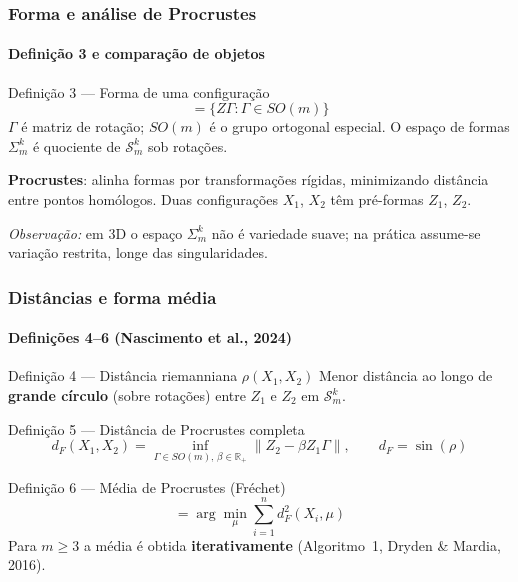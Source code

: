 \documentclass[brazilian,11pt]{beamer}
\begin{document}
\begin{frame}[shrink=8]
    \frametitle{Forma e análise de Procrustes}
    \framesubtitle{Definição 3 e comparação de objetos}

    \begin{block}{Definição 3 --- Forma de uma configuração}
        \begin{equation}
            [Z] = \{ Z\Gamma : \Gamma \in SO(m) \}
        \end{equation}
        $\Gamma$ é matriz de rotação; $SO(m)$ é o grupo ortogonal especial. O espaço de formas $\Sigma_m^k$ é quociente de $\mathcal{S}_m^k$ sob rotações.
    \end{block}

    \textbf{Procrustes}: alinha formas por transformações rígidas, minimizando distância entre pontos homólogos. Duas configurações $X_1$, $X_2$ têm pré-formas $Z_1$, $Z_2$.

    \vspace{0.2em}
    \footnotesize\textit{Observação:} em 3D o espaço $\Sigma_m^k$ não é variedade suave; na prática assume-se variação restrita, longe das singularidades.
\end{frame}

\begin{frame}[shrink=12]
    \frametitle{Distâncias e forma média}
    \framesubtitle{Definições 4--6 (Nascimento et al., 2024)}

    \small
    \begin{block}{Definição 4 --- Distância riemanniana $\rho(X_1,X_2)$}
        Menor distância ao longo de \textbf{grande círculo} (sobre rotações) entre $Z_1$ e $Z_2$ em $\mathcal{S}_m^k$.
    \end{block}

    \begin{block}{Definição 5 --- Distância de Procrustes completa}
        \begin{equation}
            d_F(X_1, X_2) = \inf_{\Gamma \in SO(m),\, \beta \in \mathbb{R}_+} \left\| Z_2 - \beta Z_1 \Gamma \right\|, \qquad d_F = \sin(\rho)
        \end{equation}
    \end{block}

    \begin{block}{Definição 6 --- Média de Procrustes (Fréchet)}
        \begin{equation}
            [\hat{\mu}] = \arg\min_{\mu} \sum_{i=1}^{n} d_F^2(X_i, \mu)
        \end{equation}
        Para $m \geq 3$ a média é obtida \textbf{iterativamente} (Algoritmo~1, Dryden \& Mardia, 2016).
    \end{block}
\end{frame}
\end{document}
